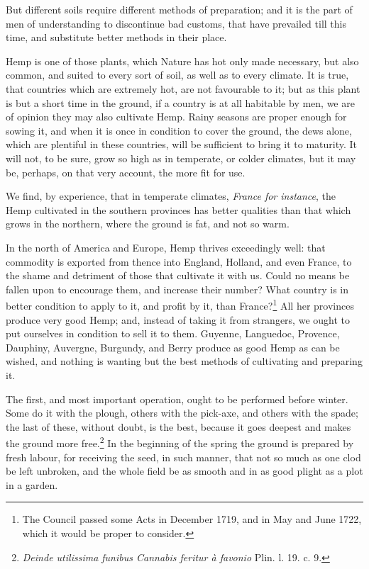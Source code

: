 \documentclass[a4paper, 11pt, oneside, polutonikogreek, english]{article}
\begin{document}
But different soils require different methods of preparation; and it is the part of men of understanding to discontinue bad customs, that have prevailed till this time, and substitute better methods in their place.

Hemp is one of those plants, which Nature has hot only made necessary, but also common, and suited to every sort of soil, as well as to every climate. It is true, that countries which are extremely hot, are not favourable to it; but as this plant is but a short time in the ground, if a country is at all habitable by men, we are of opinion they may also cultivate Hemp. Rainy seasons are proper enough for sowing it, and when it is once in condition to cover the ground, the dews alone, which are plentiful in these countries, will be sufficient to bring it to maturity. It will not, to be sure, grow so high as in temperate, or colder climates, but it may be, perhaps, on that very account, the more fit for use.

We find, by experience, that in temperate climates, \emph{France for instance}, the Hemp cultivated in the southern provinces has better qualities than that which grows in the northern, where the ground is fat, and not so warm.

In the north of America and Europe, Hemp thrives exceedingly well: that commodity is exported from thence into England, Holland, and even France, to the shame and detriment of those that cultivate it with us. Could no means be fallen upon to encourage them, and increase their number? What country is in better condition to apply to it, and profit by it, than France?\footnote{The Council passed some Acts in December 1719, and in May and June 1722, which it would be proper to consider.} All her provinces produce very good Hemp; and, instead of taking it from strangers, we ought to put ourselves in condition to sell it to them. Guyenne, Languedoc, Provence, Dauphiny, Auvergne, Burgundy, and Berry produce as good Hemp as can be wished, and nothing is wanting but the best methods of cultivating and preparing it.

The first, and most important operation, ought to be performed before winter. Some do it with the plough, others with the pick-axe, and others with the spade; the last of these, without doubt, is the best, because it goes deepest and makes the ground more free.\footnote{\emph{Deinde utilissima funibus Cannabis feritur à favonio} Plin. l. 19. c. 9.} In the beginning of the spring the ground is prepared by fresh labour, for receiving the seed, in such manner, that not so much as one clod be left unbroken, and the whole field be as smooth and in as good plight as a plot in a garden.
\end{document}

